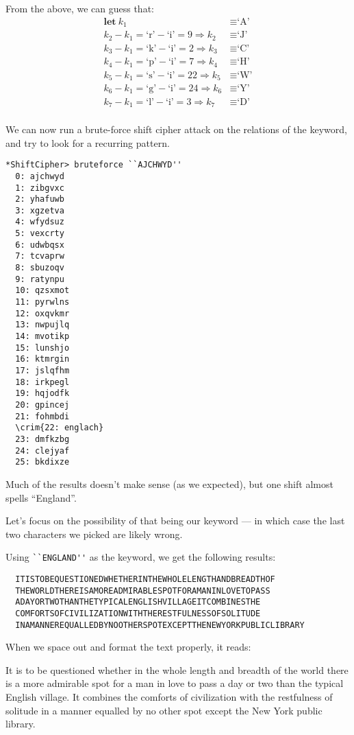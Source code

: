 \begin{Answer}
From the above, we can guess that:
\begin{align*}
  \mathbf{let\ } k_{1} &\equiv \text{`A'} \\
  k_{2} - k_{1} = \text{`r'} - \text{`i'} = 9 \Rightarrow k_{2} &\equiv \text{`J'}\\
  k_3 - k_1 = \text{`k'} - \text{`i'} = 2 \Rightarrow k_{3} &\equiv \text{`C'}\\
  k_4 - k_1 = \text{`p'} - \text{`i'} = 7 \Rightarrow k_{4} &\equiv \text{`H'}\\
  k_5 - k_1 = \text{`s'} - \text{`i'} = 22 \Rightarrow k_{5} &\equiv \text{`W'}\\
  k_6 - k_1 = \text{`g'} - \text{`i'} = 24 \Rightarrow k_{6} &\equiv \text{`Y'}\\
  k_7 - k_1 = \text{`l'} - \text{`i'} = 3 \Rightarrow k_{7} &\equiv \text{`D'}\\
\end{align*}

We can now run a brute-force shift cipher attack on the relations of the keyword,
and try to look for a recurring pattern.
\begin{multicols*}{2}
\begin{Verbatim}[commandchars=\\\{\}]
  *ShiftCipher> bruteforce ``AJCHWYD''
  0: ajchwyd
  1: zibgvxc
  2: yhafuwb
  3: xgzetva
  4: wfydsuz
  5: vexcrty
  6: udwbqsx
  7: tcvaprw
  8: sbuzoqv
  9: ratynpu
  10: qzsxmot
  11: pyrwlns
  12: oxqvkmr
  13: nwpujlq
  14: mvotikp
  15: lunshjo
  16: ktmrgin
  17: jslqfhm
  18: irkpegl
  19: hqjodfk
  20: gpincej
  21: fohmbdi
  \crim{22: englach}
  23: dmfkzbg
  24: clejyaf
  25: bkdixze
\end{Verbatim}
\end{multicols*}

\noindent
Much of the results doesn't make sense (as we expected), but one shift almost spells ``England''.

\noindent
Let's focus on the possibility of that being our keyword
--- in which case the last two characters we picked are likely wrong.

Using \Verb#``ENGLAND''# as the keyword, we get the following results:
\color{zaffre}
\begin{Verbatim}
  ITISTOBEQUESTIONEDWHETHERINTHEWHOLELENGTHANDBREADTHOF
  THEWORLDTHEREISAMOREADMIRABLESPOTFORAMANINLOVETOPASS
  ADAYORTWOTHANTHETYPICALENGLISHVILLAGEITCOMBINESTHE
  COMFORTSOFCIVILIZATIONWITHTHERESTFULNESSOFSOLITUDE
  INAMANNEREQUALLEDBYNOOTHERSPOTEXCEPTTHENEWYORKPUBLICLIBRARY
\end{Verbatim}
\color{black}

\noindent
When we space out and format the text properly, it reads:

\bigskip
\noindent
\color{zaffre}
It is to be questioned whether in the whole length and breadth
of the world there is a more admirable spot for a man in love
to pass a day or two than the typical English village.
It combines the comforts of civilization with the restfulness
of solitude in a manner equalled by no other spot except
the New York public library.
\color{black}
\end{Answer}
